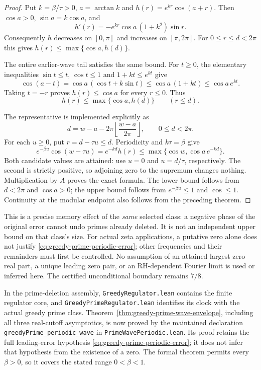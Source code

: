 \documentclass[11pt]{article}
\theoremstyle{definition}
\begin{document}
\begin{proof}
Put $k=\beta/\tau>0$, $a=\arctan k$ and
$h(r)=e^{kr}\cos(a+r)$.
Then $\cos a>0$, $\sin a=k\cos a$, and
\[
 h'(r)=-e^{kr}\cos a\,(1+k^2)\sin r .
\]
Consequently $h$ decreases on $[0,\pi]$ and increases on
$[\pi,2\pi]$. For $0\le r\le d<2\pi$ this gives
$h(r)\le\max\{\cos a,h(d)\}$.

The entire earlier-wave tail satisfies the same bound.
For $t\ge0$, the elementary inequalities $\sin t\le t$,
$\cos t\le1$ and $1+kt\le e^{kt}$ give
\[
 \cos(a-t)=\cos a\,(\cos t+k\sin t)
       \le\cos a\,(1+kt)\le\cos a\,e^{kt}.
\]
Taking $t=-r$ proves $h(r)\le\cos a$ for every $r\le0$.
Thus
\[
 h(r)\le\max\{\cos a,h(d)\}\qquad(r\le d).
\]

The representative is implemented explicitly as
\[
 d=w-a-2\pi\left\lfloor\frac{w-a}{2\pi}\right\rfloor,
 \qquad 0\le d<2\pi.
\]
For each $u\ge0$, put $r=d-\tau u\le d$.
Periodicity and $k\tau=\beta$ give
\[
 e^{-\beta u}\cos(w-\tau u)=e^{-kd}h(r)
   \le\max\{\cos w,\cos a\,e^{-kd}\}.
\]
Both candidate values are attained: use $u=0$ and $u=d/\tau$,
respectively. The second is strictly positive, so adjoining zero
to the supremum changes nothing. Multiplication by $A$ proves
the exact formula.
The lower bound follows from $d<2\pi$ and $\cos a>0$;
the upper bound follows from $e^{-\beta u}\le1$ and $\cos\le1$.
Continuity at the modular endpoint also follows from the preceding theorem.
\end{proof}

This is a precise memory effect of the \emph{same} selected class:
a negative phase of the original error cannot undo primes already deleted.
It is not an independent upper bound on that class's size.
For actual zeta applications, a putative zero alone does not justify
\eqref{eq:greedy-prime-periodic-error}; other frequencies and their
remainders must first be controlled.
No assumption of an attained largest zero real part, a unique leading
zero pair, or an RH-dependent Fourier limit is used or inferred here.
The certified unconditional boundary remains $7/8$.

In the prime-deletion assembly, \texttt{GreedyRegulator.lean}
contains the finite regulator core, and
\texttt{GreedyPrimeRegulator.lean} identifies its clock with the actual
greedy prime class.
Theorem~\ref{thm:greedy-prime-wave-envelope}, including all three
real-cutoff asymptotics, is now proved by the maintained declaration
\texttt{greedyPrime\_periodic\_wave} in
\texttt{PrimeWavePeriodic.lean}.
Its proof retains the full leading-error hypothesis
\eqref{eq:greedy-prime-periodic-error}; it does not infer that hypothesis
from the existence of a zero.
The formal theorem permits every $\beta>0$, so it covers the stated
range $0<\beta<1$.
\end{document}
